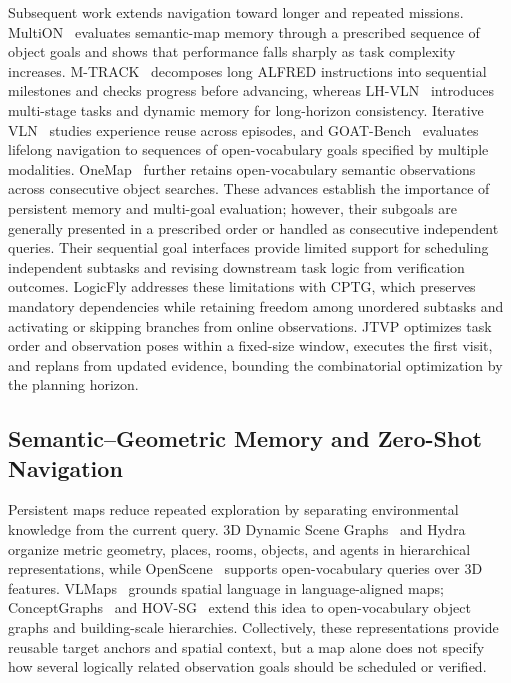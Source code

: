 \documentclass[letterpaper,10pt,journal]{IEEEtran}
\begin{document}
Subsequent work extends navigation toward longer and repeated missions. MultiON~\cite{wani2020multion} evaluates semantic-map memory through a prescribed sequence of object goals and shows that performance falls sharply as task complexity increases. M-TRACK~\cite{song2022mtrack} decomposes long ALFRED instructions into sequential milestones and checks progress before advancing, whereas LH-VLN~\cite{song2024lhvln} introduces multi-stage tasks and dynamic memory for long-horizon consistency. Iterative VLN~\cite{krantz2023ivln} studies experience reuse across episodes, and GOAT-Bench~\cite{khanna2024goat} evaluates lifelong navigation to sequences of open-vocabulary goals specified by multiple modalities. OneMap~\cite{busch2025onemap} further retains open-vocabulary semantic observations across consecutive object searches. These advances establish the importance of persistent memory and multi-goal evaluation; however, their subgoals are generally presented in a prescribed order or handled as consecutive independent queries. Their sequential goal interfaces provide limited support for scheduling independent subtasks and revising downstream task logic from verification outcomes. LogicFly addresses these limitations with CPTG, which preserves mandatory dependencies while retaining freedom among unordered subtasks and activating or skipping branches from online observations. JTVP optimizes task order and observation poses within a fixed-size window, executes the first visit, and replans from updated evidence, bounding the combinatorial optimization by the planning horizon.

\subsection{Semantic--Geometric Memory and Zero-Shot Navigation}

Persistent maps reduce repeated exploration by separating environmental knowledge from the current query. 3D Dynamic Scene Graphs~\cite{rosinol2020dsg} and Hydra~\cite{hughes2022hydra} organize metric geometry, places, rooms, objects, and agents in hierarchical representations, while OpenScene~\cite{peng2023openscene} supports open-vocabulary queries over 3D features. VLMaps~\cite{huang2023vlmaps} grounds spatial language in language-aligned maps; ConceptGraphs~\cite{gu2024conceptgraphs} and HOV-SG~\cite{werby2024hovsg} extend this idea to open-vocabulary object graphs and building-scale hierarchies. Collectively, these representations provide reusable target anchors and spatial context, but a map alone does not specify how several logically related observation goals should be scheduled or verified.
\end{document}
